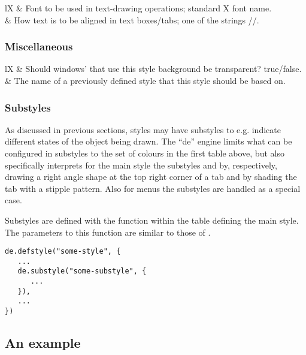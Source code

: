 \begin{tabularx}{\linewidth}{lX}
 & Font to be used in text-drawing operations; standard X font
	     name. \\
 & How text is to be aligned in text boxes/tabs; one of
		   the strings //. \\
\end{tabularx}


\subsubsection{Miscellaneous}


\begin{tabularx}{\linewidth}{lX}
 & Should windows' that use this style
	background be transparent? true/false. \\
 & The name of a previously defined style that this
	style should be based on. \\
\end{tabularx}


\subsubsection{Substyles}

As discussed in previous sections, styles may have substyles to e.g.
indicate different states of the object being drawn. The ``de'' engine
limits what can be configured in substyles to the set of colours in the
first table above, but also specifically interprets for the main style
 the substyles  and 
by, respectively, drawing a right angle shape at the top right corner 
of a tab and by shading the tab with a stipple pattern. Also for
menus the substyles  are handled as a special case.

Substyles are defined with the function  within the
table defining the main style. The parameters to this function are 
similar to those of .

\begin{verbatim}
de.defstyle("some-style", {
   ...
   de.substyle("some-substyle", {
      ...
   }),
   ...
})
\end{verbatim}


\subsection{An example}

